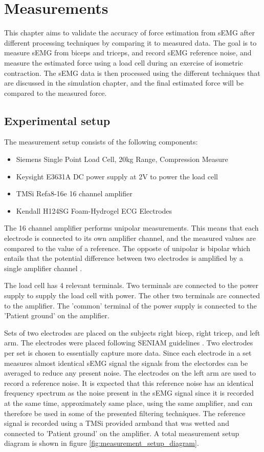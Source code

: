 \chapter{Measurements}
This chapter aims to validate the accuracy of force estimation from sEMG after different processing techniques by comparing it to measured data. The goal is to measure sEMG from biceps and triceps, and record sEMG reference noise, and measure the estimated force using a load cell during an exercise of isometric contraction. The sEMG data is then processed using the different techniques that are discussed in the simulation chapter, and the final estimated force will be compared to the measured force. 

\section{Experimental setup}
The measurement setup consists of the following components:
\begin{itemize}
    \item Siemens Single Point Load Cell, 20kg Range, Compression Measure
    \item Keysight E3631A DC power supply at 2V to power the load cell
    \item TMSi Refa8-16e 16 channel amplifier
    \item Kendall H124SG Foam-Hydrogel ECG Electrodes 
\end{itemize}

The 16 channel amplifier performs unipolar measurements. This means that each electrode is connected to its own amplifier channel, and the measured values are compared to the value of a reference. The opposte of unipolar is bipolar which entails that the potential difference between two electrodes is amplified by a single amplifier channel \cite{tmsi_unipolar_bipolar}. 

The load cell has 4 relevant terminals. Two terminals are connected to the power supply to supply the load cell with power. The other two terminals are connected to the amplifier. The 'common' terminal of the power supply is connected to the 'Patient ground' on the amplifier.

Sets of two electrodes are placed on the subjects right bicep, right tricep, and left arm. The electrodes were placed following SENIAM guidelines \cite{seniam}. Two electrodes per set is chosen to essentially capture more data. Since each electrode in a set measures almost identical sEMG signal the signals from the electordes can be averaged to reduce any present noise. The electrodes on the left arm are used to record a reference noise. It is expected that this reference noise has an identical frequency spectrum as the noise present in the sEMG signal since it is recorded at the same time, approximately same place, using the same amplifier, and can therefore be used in some of the presented filtering techniques. The reference signal is recorded using a TMSi provided armband that was wetted and connected to 'Patient ground' on the amplifier. A total measurement setup diagram is shown in figure \ref{fig:measurement_setup_diagram}.

